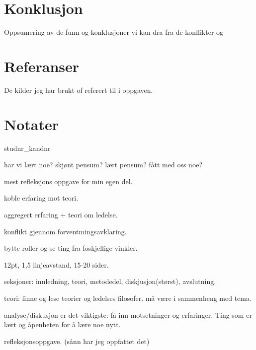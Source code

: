 \documentclass[12pt, a4paper]{article}
\begin{document}
\section{Konklusjon}\label{konklusjon}
Oppsumering av de funn og konklusjoner vi kan dra fra de konflikter og 

\section{Referanser}
De kilder jeg har brukt of referert til i oppgaven. 

\section{Notater}

studnr_kandnr

har vi lært noe?
skjønt pensum?
lært pensum?
fått med oss noe?

mest refleksjons oppgave for min egen del. 

koble erfaring mot teori. 

aggregert erfaring + teori om ledelse. 

konflikt gjennom forventmingsavklaring. 

bytte roller og se ting fra foskjellige vinkler. 

12pt, 1,5 linjeavstand, 15-20 sider.

seksjoner: 
innledning, teori, metodedel, diskjusjon(størst), avslutning. 

teori: 
finne og lese teorier og ledelses filosofer. 
må være i sammenheng med tema. 

analyse/diskusjon er det viktigste:
få inn motsetninger og erfaringer. Ting som er lært og åpenheten for å lære noe
nytt. 

refleksjonsoppgave. (sånn har jeg oppfattet det)
\end{document}
